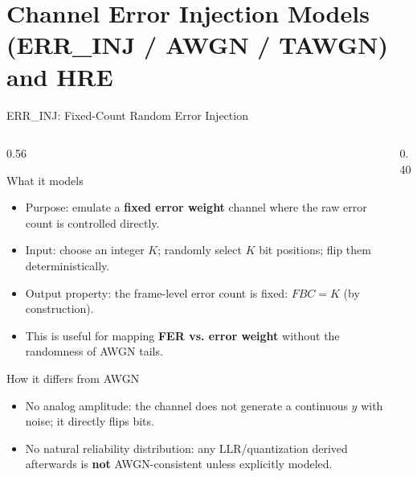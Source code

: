 \section{Channel Error Injection Models (ERR\_INJ / AWGN / TAWGN) and HRE}

\begin{frame}{ERR\_INJ: Fixed-Count Random Error Injection}
\vspace{-0.2cm}
\begin{columns}
  \begin{column}{0.56\textwidth}
    \begin{block}{What it models}
      \begin{itemize}
        \item Purpose: emulate a \textbf{fixed error weight} channel where the raw error count is controlled directly.
        \item Input: choose an integer $K$; randomly select $K$ bit positions; flip them deterministically.
        \item Output property: the frame-level error count is fixed: $FBC = K$ (by construction).
        \item This is useful for mapping \textbf{FER vs. error weight} without the randomness of AWGN tails.
      \end{itemize}
    \end{block}
    \begin{block}{How it differs from AWGN}
      \begin{itemize}
        \item No analog amplitude: the channel does not generate a continuous $y$ with noise; it directly flips bits.
        \item No natural reliability distribution: any LLR/quantization derived afterwards is \textbf{not} AWGN-consistent unless explicitly modeled.
      \end{itemize}
    \end{block}
  \end{column}
  \begin{column}{0.40\textwidth}
    \centering
  \end{column}
\end{columns}
\end{frame}

